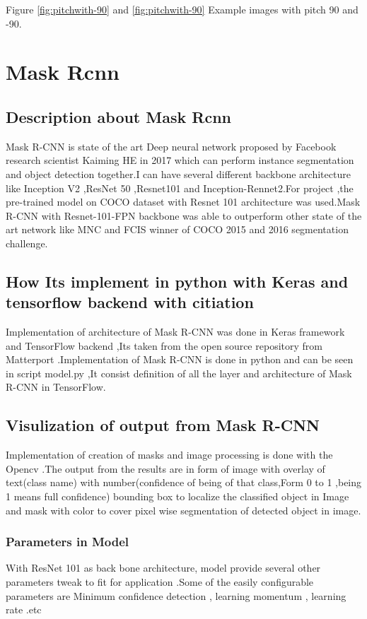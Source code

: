 Figure \ref{fig:pitchwith-90} and \ref{fig:pitchwith-90} Example images with pitch 90 and -90.


\section{Mask Rcnn}

\subsection{Description about Mask Rcnn}
Mask R-CNN\cite{He2017} is state of the art Deep neural network proposed by Facebook research scientist Kaiming HE in 2017 which can perform instance segmentation and object detection together.I can have several different backbone architecture like Inception V2 ,ResNet 50 ,Resnet101 and Inception-Rennet2.For project ,the pre-trained model on COCO dataset with Resnet 101 architecture was used.Mask R-CNN with Resnet-101-FPN backbone was able to outperform other state of the art network like MNC and FCIS winner of COCO 2015 and 2016 segmentation challenge. 

\subsection{How Its implement in python with Keras and tensorflow backend with citiation }
Implementation of architecture of Mask R-CNN was done in Keras framework and TensorFlow backend ,Its taken from the open source repository from Matterport \cite{matterport_maskrcnn_2017} .Implementation of Mask R-CNN is done in python and can be seen in script model.py ,It consist definition of all the layer and architecture of Mask R-CNN in TensorFlow.

\subsection{Visulization of output from Mask R-CNN}
Implementation of creation of masks and image processing is done with the Opencv \cite{Culjak2012}.The output from the results are in form of image with overlay of text(class name) with number(confidence of being of that class,Form 0 to 1 ,being 1 means full confidence) bounding box to localize the classified object in Image and mask with color to cover pixel wise segmentation of detected object in image.

\subsubsection{Parameters in Model}
With ResNet 101 as back bone architecture, model provide several other parameters tweak to fit for application .Some of the easily configurable parameters are Minimum confidence detection , learning momentum , learning rate .etc 

